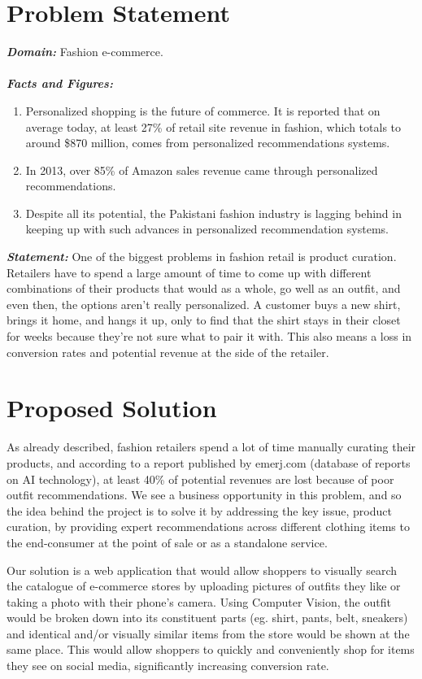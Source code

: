 \section{Problem Statement}

\textbf{\emph{Domain:}} Fashion e-commerce. \\\\
\textbf{\emph{Facts and Figures:}} 
\begin{enumerate}
	\item Personalized shopping is the future of commerce. It is reported that on average today, at least 27\% of retail site revenue in fashion, which totals to around \$870 million, comes from personalized recommendations systems. \cite{salesforce}
	\item In 2013, over 85\% of Amazon sales revenue came through personalized recommendations. \cite{mckinsey}
	\item Despite all its potential, the Pakistani fashion industry is lagging behind in keeping up with such advances in personalized recommendation systems. \cite{thenewspk}
\end{enumerate}
\textbf{\emph{Statement:}} One of the biggest problems in fashion retail is product curation. Retailers have to spend a large amount of time to come up with different combinations of their products that would as a whole, go well as an outfit, and even then, the options aren’t really personalized. A customer buys a new shirt, brings it home, and hangs it up, only to find that the shirt stays in their closet for weeks because they’re not sure what to pair it with. This also means a loss in conversion rates and potential revenue at the side of the retailer.

\section{Proposed Solution}

As already described, fashion retailers spend a lot of time manually curating their products, and according to a report published by emerj.com (database of reports on AI technology), at least 40\% of potential revenues are lost because of poor outfit recommendations. We see a business opportunity in this problem, and so the idea behind the project is to solve it by addressing the key issue, product curation, by providing expert recommendations across different clothing items to the end-consumer at the point of sale or as a standalone service.


Our solution is a web application that would allow shoppers to visually search the catalogue of e-commerce stores by uploading pictures of outfits they like or taking a photo with their phone’s camera. Using Computer Vision, the outfit would be broken down into its constituent parts (eg. shirt, pants, belt, sneakers) and identical and/or visually similar items from the store would be shown at the same place. This would allow shoppers to quickly and conveniently shop for items they see on social media, significantly increasing conversion rate.

